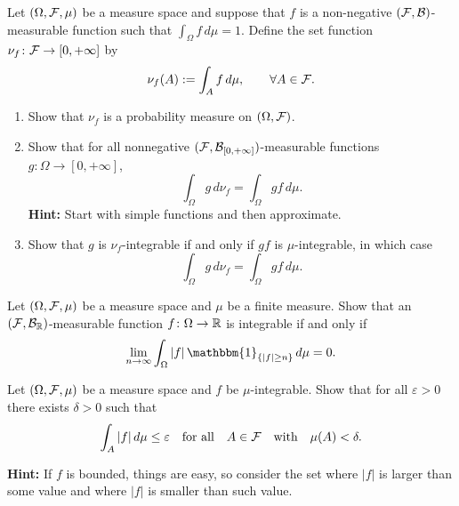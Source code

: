 \begin{problem}\label{prb:measure}
	Let $(\Omega,\mathcal F,\mu)$ be a measure space and suppose that $f$ is a non-negative $(\mathcal F,\mathcal B)$-measurable function such that $\int_\Omega f\,d\mu=1$. Define the set function $\nu_f\colon\mathcal F\to[0,+\infty]$ by
	\[
		\nu_f(A):=\int_A f\,d\mu,\qquad \forall A\in\mathcal F.
	\]
	\begin{enumerate}[label=(\alph*)]
		\item Show that $\nu_f$ is a probability measure on $(\Omega,\mathcal F)$.
		\item Show that for all nonnegative $(\mathcal F,\mathcal B_{[0,+\infty]})$-measurable functions $g\colon\Omega\to [0,+\infty]$,
		\[
			\int_\Omega g\, d\nu_f = \int_\Omega g f\,d\mu.
		\]
		\textbf{Hint:} Start with simple functions and then approximate.
		\item Show that $g$ is $\nu_f$-integrable if and only if $g f$ is $\mu$-integrable, in which case
		\[
			\int_\Omega g\,d\nu_f = \int_\Omega g f\,d\mu.
		\]
	\end{enumerate}
\end{problem}


\begin{problem}
	Let $(\Omega,\mathcal F,\mu)$ be a measure space and $\mu$ be a finite measure. Show that an $(\mathcal F,\mathcal B_{\mathbb R})$-measurable function $f\colon\Omega\to \mathbb R$ is integrable if and only if
	\[
		\lim_{n\to\infty}\int_\Omega |f|\,\mathbbm{1}_{\{|f|\ge n\}}\,d\mu = 0.
	\]
\end{problem}


\begin{problem}
	Let $(\Omega,\mathcal F,\mu)$ be a measure space and $f$ be $\mu$-integrable. Show that for all $\varepsilon>0$ there exists $\delta>0$ such that
	\[
		\int_A |f|\,d\mu\le \varepsilon\quad \text{for all}\quad A\in\mathcal F\quad \text{with}\quad \mu(A)<\delta.
	\]
	
\smallskip
	
	\noindent\textbf{Hint:} If $f$ is bounded, things are easy, so consider the set where $|f|$ is larger than some value and where $|f|$ is smaller than such value.
\end{problem}



